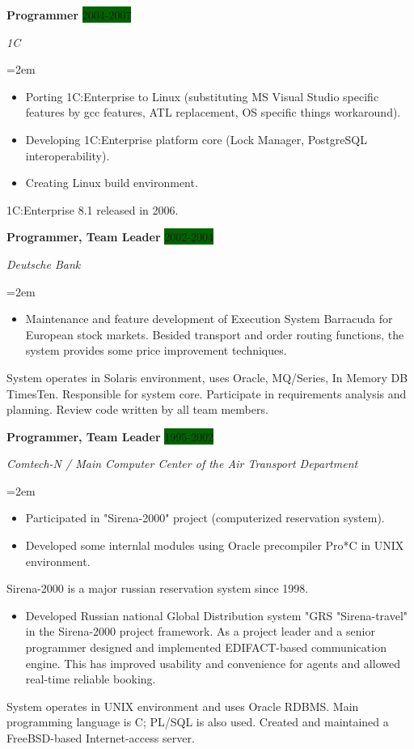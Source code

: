 \documentclass[paper=a4,fontsize=11pt]{scrartcl} %
\newcommand{\sepspace}{\vspace*{1em}}       %
\newcommand{\EducationEntry}[4]{\pagebreak[2]
        \noindent \textbf{#1} \hfill      %
        \colorbox{DarkGreen}{%
            \hfill\color{White}#2} \par  %
        \noindent \textit{#3} \par        %
        \noindent\hangindent=2em\hangafter=0 \small #4 %
        \normalsize \par}
\newcommand{\WorkEntry}[4]{\pagebreak[2]    %
        \noindent \textbf{#1} \hfill      %
        \colorbox{DarkGreen}{\color{White}#2} \par  %
        \noindent \textit{#3} \par        %
        \noindent\hangindent=2em\hangafter=0 \small #4 %
        \normalsize \par         \sepspace}
\begin{document}
\WorkEntry{Programmer}{2004-2007}{1C}{
\begin{itemize}\itemsep0em
\item Porting 1C:Enterprise to Linux (substituting MS Visual Studio specific features by gcc features, ATL replacement, OS specific things workaround).
\item Developing 1C:Enterprise platform core (Lock Manager, PostgreSQL interoperability).
\item Creating Linux build environment.
\end{itemize}
1C:Enterprise 8.1 released in 2006.
}

\WorkEntry{Programmer, Team Leader}{2002-2004}{Deutsche Bank}{
\begin{itemize}\itemsep0em
\item  Maintenance and feature development of Execution System Barracuda for European stock markets. Besided transport and order routing functions, the system provides some price improvement techniques.
\end{itemize}
System operates in Solaris environment, uses Oracle, MQ/Series, In Memory DB TimesTen.
Responsible for system core.
Participate in requirements analysis and planning. 
Review code written by all team members.
}

\WorkEntry{Programmer, Team Leader}{1995-2002}{Comtech-N / Main Computer Center of the Air Transport Department}{
\begin{itemize}\itemsep0em
\item Participated in "Sirena-2000" project  (computerized reservation system).
\item Developed some internlal modules using Oracle precompiler Pro*C in UNIX environment. 
\end{itemize}  
Sirena-2000 is a major russian reservation system since 1998. 
\begin{itemize}\itemsep0em
\item Developed Russian national Global Distribution system "GRS "Sirena-travel" in the Sirena-2000 project framework. As a project leader and a senior programmer designed and implemented EDIFACT-based communication engine. This has improved usability and convenience for agents and allowed real-time reliable booking.
\end{itemize}
System operates in UNIX environment and uses Oracle RDBMS.
Main programming language is C; PL/SQL is also used.
Created and maintained a FreeBSD-based Internet-access server.
}
\end{document}
